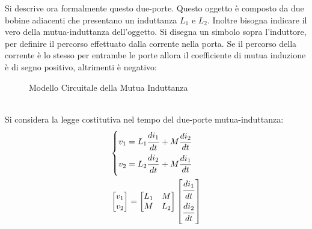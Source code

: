 \documentclass{article}
\numberwithin{equation}{subsection}
\begin{document}
Si descrive ora formalmente questo due-porte. Questo oggetto è composto da due bobine adiacenti che presentano un induttanza $L_1$ e $L_2$. Inoltre 
bisogna indicare il vero della mutua-induttanza dell'oggetto. Si disegna un simbolo sopra l'induttore, per definire il percorso effettuato dalla corrente nella porta. 
Se il percorso della corrente è lo stesso per entrambe le porte allora il coefficiente di mutua induzione è di segno positivo, altrimenti è negativo:
\begin{figure}[ht]%
    \centering
    \qquad
    \caption{Modello Circuitale della Mutua Induttanza}
    \label{fig:mutua-induttanza}
\end{figure}
\\
Si considera la legge costitutiva nel tempo del due-porte mutua-induttanza:
\begin{gather*}
    \begin{cases}
        v_1=L_1\displaystyle\frac{\strut di_1}{\strut dt}+M\frac{di_2}{dt}\\
        v_2=L_2\displaystyle\frac{\strut di_2}{\strut dt}+M\frac{di_1}{dt}
    \end{cases}\\
    \begin{bmatrix}
        v_1\\v_2
    \end{bmatrix}=\begin{bmatrix}
        L_1&M\\M&L_2
    \end{bmatrix}\begin{bmatrix}
        \displaystyle\frac{\strut di_1}{\strut dt}\\ \displaystyle\frac{\strut di_2}{\strut dt}
    \end{bmatrix}
\end{gather*}
\end{document}
